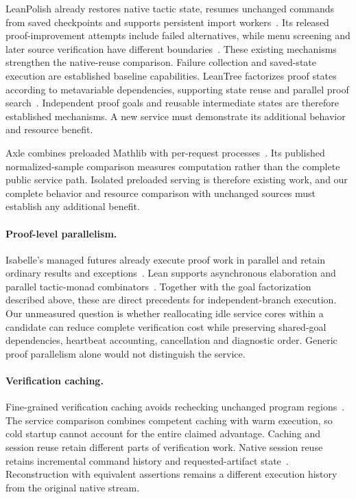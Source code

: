 \documentclass[10pt,twocolumn]{article}
\begin{document}
LeanPolish already restores native tactic state, resumes unchanged commands from saved checkpoints and supports persistent import workers~\cite{leanpolishSource}. Its released proof-improvement attempts include failed alternatives, while menu screening and later source verification have different boundaries~\cite{leanpolishPaper}. These existing mechanisms strengthen the native-reuse comparison. Failure collection and saved-state execution are established baseline capabilities.
LeanTree factorizes proof states according to metavariable dependencies,
supporting state reuse and parallel proof search~\cite{leantree}.
Independent proof goals and reusable intermediate states are therefore
established mechanisms. A new service must demonstrate its additional
behavior and resource benefit.

Axle combines preloaded Mathlib with per-request processes~\cite{axle}.
Its published normalized-sample comparison measures computation rather than
the complete public service path. Isolated preloaded serving is therefore
existing work, and our complete behavior and resource comparison with unchanged sources
must establish any additional benefit.

\paragraph{Proof-level parallelism.}
Isabelle's managed futures already execute proof work in parallel and retain
ordinary results and exceptions~\cite{wenzelProofFutures}.
Lean supports asynchronous elaboration and parallel tactic-monad
combinators~\cite{lean4,leanParallelSource}.
Together with the goal factorization described above, these are direct
precedents for independent-branch execution.
Our unmeasured question is whether reallocating idle service cores within a
candidate can reduce complete verification cost while preserving shared-goal
dependencies, heartbeat accounting, cancellation and diagnostic order.
Generic proof parallelism alone would not distinguish the service.

\paragraph{Verification caching.}
Fine-grained verification caching avoids rechecking unchanged program regions~\cite{boogieCache}. The service comparison combines competent caching with warm execution, so cold startup cannot account for the entire claimed advantage. Caching and session reuse retain different parts of verification work. Native session reuse retains incremental command history and requested-artifact state~\cite{z3api}. Reconstruction with equivalent assertions remains a different execution history from the original native stream.
\end{document}
